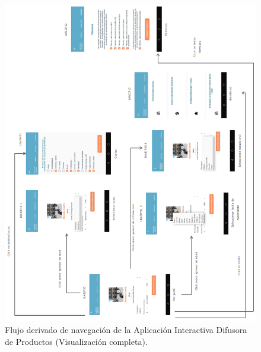 \begin{figure}[htbp!]
		\centering
			\includegraphics[width=1 \textwidth]{imagenes/mapaNav2Nuevo}
		\caption{Flujo derivado de navegación de la Aplicación Interactiva Difusora de Productos (Visualización completa).}
		\label{image:map4}
\end{figure}
\FloatBarrier

